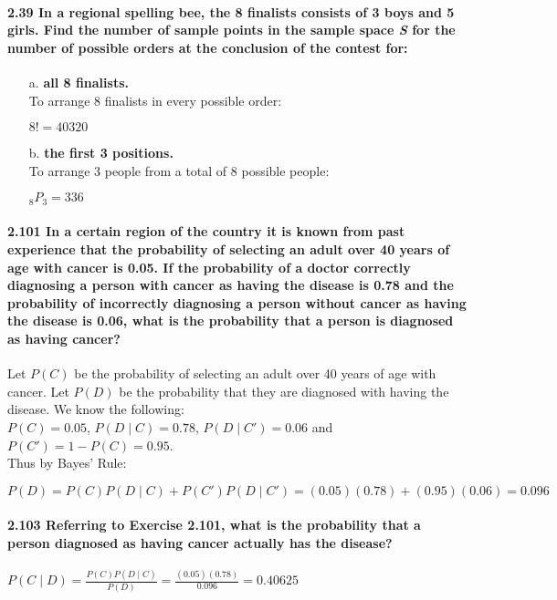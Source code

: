 \documentclass{article}
\begin{document}
\paragraph{2.39 In a regional spelling bee, the 8 finalists consists of 3 boys and 5 girls. 
Find the number of sample points in the sample space \emph{S} for the number of 
possible orders at the conclusion of the contest for:}
\begin{enumerate}
\item[a.] \textbf{all 8 finalists.}\\
To arrange 8 finalists in every possible order:
\begin{center}
$\boxed{8! = 40320}$
\end{center}
\item[b.] \textbf{the first 3 positions.}\\
To arrange 3 people from a total of 8 possible people:
\begin{center}
$\boxed{_8P_3 = 336}$
\end{center}
\end{enumerate}

\paragraph{2.101 In a certain region of the country it is known from past experience that 
the probability of selecting an adult over 40 years of age with cancer is 0.05. If the 
probability of a doctor correctly diagnosing a person with cancer as having the disease 
is 0.78 and the probability of incorrectly diagnosing a person without cancer as having 
the disease is 0.06, what is the probability that a person is diagnosed as having 
cancer?\\}
Let $P(C)$ be the probability of selecting an adult over 40 years of age with cancer.
Let $P(D)$ be the probability that they are diagnosed with having the disease.
We know the following:\\
$P(C) = 0.05$, $P(D \mid C) = 0.78$, $P(D \mid C') = 0.06$ and $P(C') = 1 - P(C) = 0.95$.\\
Thus by Bayes' Rule:
\begin{center}
$\boxed{P(D) = P(C)P(D \mid C) + P(C')P(D \mid C') = (0.05)(0.78)+(0.95)(0.06) = 0.096}$
\end{center}

\paragraph{2.103 Referring to Exercise 2.101, what is the probability that a person 
diagnosed as having cancer actually has the disease?\\}
\begin{center}
$\boxed{P(C \mid D) = \frac{P(C)P(D \mid C)}{P(D)} = \frac{(0.05)(0.78)}{0.096} = 0.40625}$
\end{center}
\end{document}
